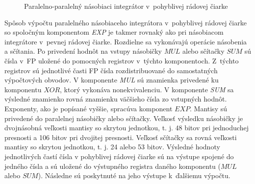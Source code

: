 \begin{figure}[h]
\centering
{}
\caption{Paralelno-paralelný násobiaci integrátor v~pohyblivej rádovej čiarke}
\label{ppni_fp}
\end{figure}
\bigskip

Spôsob výpočtu paralelného násobiaceho integrátora v~pohyblivej rádovej čiarke so spoločným komponentom \textit{EXP} je takmer rovnaký ako pri násobiacom integrátore v~pevnej rádovej čiarke. Rozdielne sa vykonávajú operácie násobenia a sčítania. Po privedení hodnôt na vstupy násobičky $ MUL $ alebo sčítačky $ SUM $ sú čísla v~FP uložené do pomocných registrov v~týchto komponentoch. Z~týchto registrov sú jednotlivé časti FP čísla rozdistribuované do samostatných výpočtových obvodov. V komponente \textit{MUL} sú znamienka privedené ku komponentu $ XOR $, ktorý vykonáva nonekvivalenciu. V komponente \textit{SUM} sa výsledné znamienko rovná znamienku väčšieho čísla zo vstupných hodnôt. Exponenty, ako je popísané vyššie, spracúva komponent $ EXP $. Mantisy sú privedené do paralelnej násobičky alebo sčítačky. Veľkosť výsledku násobičky je dvojnásobná veľkosti mantisy so skrytou jednotkou, t. j. 48 bitov pri jednoduchej presnosti a 106 bitov pri dvojitej presnosti. Veľkosť sčítačky sa rovná veľkosti mantisy so skrytou jednotkou, t. j. 24 alebo 53 bitov. Výsledné hodnoty jednotlivých častí čísla v pohyblivej rádovej čiarke sú na výstupe spojené do jedného čísla a sú uložené do výstupného registra daného komponentu ($ MUL $ alebo $ SUM $). Následne sú poskytnuté na jeho výstupe k~ďalšiemu výpočtu.

